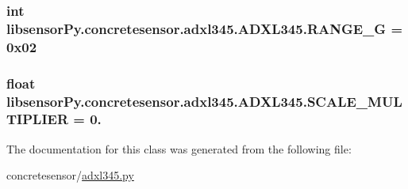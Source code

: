 \subsubsection[{R\+A\+N\+G\+E\+\_\+8\+G}]{\setlength{\rightskip}{0pt plus 5cm}int libsensor\+Py.\+concretesensor.\+adxl345.\+A\+D\+X\+L345.\+R\+A\+N\+G\+E\+\_\+G = 0x02\hspace{0.3cm}{\ttfamily [static]}}\label{classlibsensorPy_1_1concretesensor_1_1adxl345_1_1ADXL345_a062b30aed4d476b601ec1c1d094e9846}
\hypertarget{classlibsensorPy_1_1concretesensor_1_1adxl345_1_1ADXL345_a8038c2c38501d03d5e37d34c2b412da4}{}
\subsubsection[{S\+C\+A\+L\+E\+\_\+\+M\+U\+L\+T\+I\+P\+L\+I\+E\+R}]{\setlength{\rightskip}{0pt plus 5cm}float libsensor\+Py.\+concretesensor.\+adxl345.\+A\+D\+X\+L345.\+S\+C\+A\+L\+E\+\_\+\+M\+U\+L\+T\+I\+P\+L\+I\+E\+R = 0.\hspace{0.3cm}{\ttfamily [static]}}\label{classlibsensorPy_1_1concretesensor_1_1adxl345_1_1ADXL345_a8038c2c38501d03d5e37d34c2b412da4}


The documentation for this class was generated from the following file\+:\begin{DoxyCompactItemize}
\item 
concretesensor/\hyperlink{concretesensor_2adxl345_8py}{adxl345.\+py}\end{DoxyCompactItemize}
